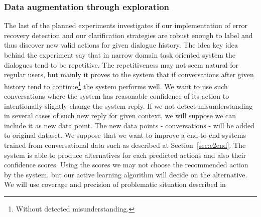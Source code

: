 \documentclass[11pt]{article}
\begin{document}
\subsubsection*{Data augmentation through exploration}
The last of the planned experiments investigates if our implementation of error recovery detection and our clarification strategies are robust enough to label and thus discover new valid actions for given dialogue history.
The idea key idea behind the experiment say that in narrow domain task oriented system the dialogues tend to be repetitive.
The repetitiveness may not seem natural for regular users, but mainly it proves to the system that if conversations after given history tend to continue\footnote{Without detected misunderstanding.} the system performs well.
We want to use such conversations where the system has reasonable confidence of its action to intentionally slightly change the system reply.
If we not detect misunderstanding in several cases of such new reply for given context, we will suppose we can include it as new data point. 
The new data points - conversations - will be added to original dataset.
We suppose that we want to improve a end-to-end systems trained from conversational data such as described at Section~\ref{sec:e2end}.
The system is able to produce alternatives for each predicted actions and also their confidence scores.
Using the scores we may not choose the recommended action by the system, but our active learning algorithm will decide on the alternative.
We will use coverage and precision of problematic situation described in~\cite{meena_datadriven_2016}
\end{document}
